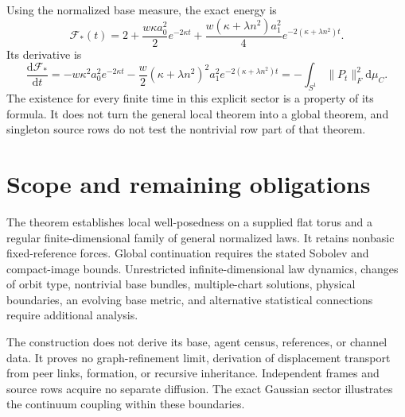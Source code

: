 \documentclass[11pt]{article}
\newcommand{\dd}{\mathrm d}
\begin{document}
Using the normalized base measure, the exact energy is
\begin{equation}
 \mathcal F_*(t)=2+\frac{w\kappa a_0^2}{2}e^{-2\kappa t}
 +\frac{w(\kappa+\lambda n^2)a_1^2}{4}
                         e^{-2(\kappa+\lambda n^2)t}.
 \label{eq:exactenergy}
\end{equation}
Its derivative is
\begin{equation}
 \frac{\dd\mathcal F_*}{\dd t}
 =-w\kappa^2a_0^2e^{-2\kappa t}
  -\frac w2(\kappa+\lambda n^2)^2a_1^2e^{-2(\kappa+\lambda n^2)t}
 =-\int_{S^1}\|P_t\|_F^2\dd\mu_C.
\end{equation}
The existence for every finite time in this explicit sector is a property of its formula. It does not turn the general local theorem into a global theorem, and singleton source rows do not test the nontrivial row part of that theorem.

\section{Scope and remaining obligations}

The theorem establishes local well-posedness on a supplied flat torus and a regular finite-dimensional family of general normalized laws. It retains nonbasic fixed-reference forces. Global continuation requires the stated Sobolev and compact-image bounds. Unrestricted infinite-dimensional law dynamics, changes of orbit type, nontrivial base bundles, multiple-chart solutions, physical boundaries, an evolving base metric, and alternative statistical connections require additional analysis.

The construction does not derive its base, agent census, references, or channel data. It proves no graph-refinement limit, derivation of displacement transport from peer links, formation, or recursive inheritance. Independent frames and source rows acquire no separate diffusion. The exact Gaussian sector illustrates the continuum coupling within these boundaries.
\end{document}
